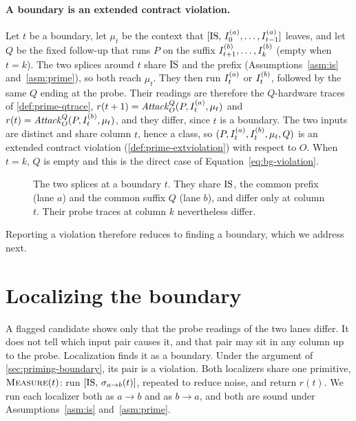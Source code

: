 \paragraph{A boundary is an extended contract violation.} Let $t$ be a boundary, let $\mu_t$ be the
context that $[\mathrm{IS},\,I_{0}^{(a)},\dots,I_{t-1}^{(a)}]$ leaves, and let $Q$ be the fixed follow-up that
runs $P$ on the suffix $I_{t+1}^{(b)},\dots,I_{k}^{(b)}$ (empty when $t=k$). The two splices around
$t$ share $\mathrm{IS}$ and the prefix (Assumptions~\ref{asm:is} and~\ref{asm:prime}), so both reach
$\mu_t$. They then run $I_{t}^{(a)}$ or $I_{t}^{(b)}$, followed by the same $Q$ ending at the probe.
Their readings are therefore the $Q$-hardware traces of \autoref{def:prime-qtrace},
$r(t+1)=\mathit{Attack}^{Q}_{O}(P,I_{t}^{(a)},\mu_t)$ and $r(t)=\mathit{Attack}^{Q}_{O}(P,I_{t}^{(b)},\mu_t)$, and they differ, since
$t$ is a boundary. The two inputs are distinct and share column $t$, hence a class, so
$(P,I_{t}^{(a)},I_{t}^{(b)},\mu_t,Q)$ is an extended contract violation
(\autoref{def:prime-extviolation}) with respect to $O$. When $t=k$, $Q$ is empty and this is the
direct case of Equation~\eqref{eq:bg-violation}.

\begin{figure}[t]
\centering
\fitwidth{}
\caption{The two splices at a boundary $t$. They share $\mathrm{IS}$, the common prefix (lane $a$) and the
common suffix $Q$ (lane $b$), and differ only at column $t$. Their probe traces at column $k$
nevertheless differ.}
\label{fig:priming-splice}
\end{figure}

Reporting a violation therefore reduces to finding a boundary, which we address next.

\section{Localizing the boundary}
\label{sec:priming-localizers}

A flagged candidate shows only that the probe readings of the two lanes differ. It does not tell
which input pair causes it, and that pair may sit in any column up to the probe. Localization finds
it as a boundary. Under the argument of \autoref{sec:priming-boundary}, its pair is a violation.
Both localizers share one primitive, $\textsc{Measure}(t)$: run $[\mathrm{IS},\,\sigma_{a\to b}(t)]$, repeated to
reduce noise, and return $r(t)$. We run each localizer both as $a\to b$ and as $b\to a$, and both
are sound under Assumptions~\ref{asm:is} and~\ref{asm:prime}.

